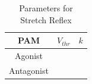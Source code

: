 \begin{table}[h]
    \centering
    \caption{Parameters for Stretch Reflex} 
    \begin{tabular}{c|cc}
        \hline
        PAM &$V_{thr}$&$k$\\
        \hline \hline
        Agonist & & \\
        Antagonist & &\\
        \hline
    \end{tabular}
\label{tab:reflex_para}
\end{table}







